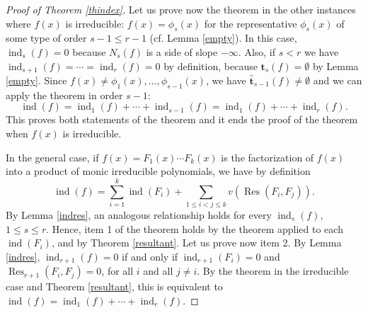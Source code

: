\documentclass{amsart}
\def\op{\operatorname}
\def\ind{\op{ind}}
\def\res{\op{Res}}
\def\tt{\hat{\mathbf{t}}}
\def\ty{\mathbf{t}}
\begin{document}
\begin{proof}[Proof of Theorem \ref{thindex}]
Let us prove now the theorem in the other instances where $f(x)$ is irreducible: $f(x)=\phi_s(x)$ for the representative $\phi_s(x)$ of some type of order $s-1\le r-1$  (cf. Lemma \ref{empty}). In this case, $\ind_s(f)=0$ because $N_s(f)$ is a side of slope $-\infty$. Also, if $s<r$ we have $\ind_{s+1}(f)=\cdots=\ind_r(f)=0$ by definition, because $\ty_s(f)=\emptyset$ by Lemma \ref{empty}. Since $f(x)\ne\phi_1(x),\dots,\phi_{s-1}(x)$, we have $\tt_{s-1}(f)\ne\emptyset$ and we can apply the theorem in order $s-1$:
$$
\ind(f)=\ind_1(f)+\cdots+\ind_{s-1}(f)=\ind_1(f)+\cdots+\ind_r(f).
$$This proves  both statements of the theorem and it ends the proof of the theorem when $f(x)$ is irreducible.

In the general case, if $f(x)=F_1(x)\cdots F_k(x)$ is the factorization of $f(x)$ into a product of monic irreducible polynomials,
we have by definition
$$
\ind(f)=\sum_{i=1}^k\ind(F_i)+\sum_{1\le i<j\le k}v(\res(F_i,F_j)).
$$ 
By Lemma \ref{indres}, an analogous relationship holds for every $\ind_s(f)$, $1\le s\le r$. Hence, item 1 of the theorem holds by the theorem applied to each $\ind(F_i)$, and by Theorem \ref{resultant}. Let us prove now item 2. By Lemma \ref{indres},  $\ind_{r+1}(f)=0$ if and only if $\ind_{r+1}(F_i)=0$ and $\res_{r+1}(F_i,F_j)=0$, for all $i$ and all $j\ne i$. By the theorem in the irreducible case and Theorem  \ref{resultant}, this is equivalent to $\ind(f)=\ind_1(f)+\cdots+\ind_r(f)$.
\end{proof}
\end{document}
